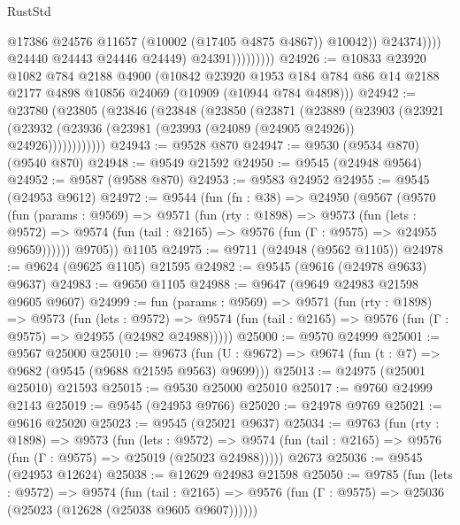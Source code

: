 \begin{lexlean}{RustStd}
\begin{coremodule}
                                    @17386
                                    @24576
                                    @11657
                                    (@10002 (@17405 @4875 @4867))
                                    @10042))
                                @24374))))
                        @24440
                        @24443
                        @24446
                        @24449)
                      @24391)))))))))
@24926 := @10833
    @23920
    @1082
    @784
    @2188
    @4900
    (@10842
      @23920
      @1953
      @184
      @784
      @86
      @14
      @2188
      @2177
      @4898
      @10856
      @24069
      (@10909 (@10944 @784 @4898)))
@24942 := @23780
    (@23805
      (@23846
        (@23848
          (@23850
            (@23871
              (@23889
                (@23903
                  (@23921
                    (@23932 (@23936 (@23981 (@23993 (@24089 (@24905 @24926)) @24926))))))))))))
@24943 := @9528 @870
@24947 := @9530 (@9534 @870) (@9540 @870)
@24948 := @9549 @21592
@24950 := @9545 (@24948 @9564)
@24952 := @9587 (@9588 @870)
@24953 := @9583 @24952
@24955 := @9545 (@24953 @9612)
@24972 := @9544
    (fun (fn : @38) =>
    @24950
      (@9567
        (@9570
          (fun (params : @9569) =>
          @9571
            (fun (rty : @1898) =>
            @9573
              (fun (lets : @9572) =>
              @9574 (fun (tail : @2165) => @9576 (fun (Γ : @9575) => @24955 @9659))))))
        @9705))
    @1105
@24975 := @9711 (@24948 (@9562 @1105))
@24978 := @9624 (@9625 @1105) @21595
@24982 := @9545 (@9616 (@24978 @9633) @9637)
@24983 := @9650 @1105
@24988 := @9647 (@9649 @24983 @21598 @9605 @9607)
@24999 := fun (params : @9569) =>
  @9571
    (fun (rty : @1898) =>
    @9573
      (fun (lets : @9572) =>
      @9574 (fun (tail : @2165) => @9576 (fun (Γ : @9575) => @24955 (@24982 @24988)))))
@25000 := @9570 @24999
@25001 := @9567 @25000
@25010 := @9673
    (fun (U : @9672) => @9674 (fun (t : @7) => @9682 (@9545 (@9688 @21595 @9563) @9699)))
@25013 := @24975 (@25001 @25010) @21593
@25015 := @9530 @25000 @25010
@25017 := @9760 @24999 @2143
@25019 := @9545 (@24953 @9766)
@25020 := @24978 @9769
@25021 := @9616 @25020
@25023 := @9545 (@25021 @9637)
@25034 := @9763
    (fun (rty : @1898) =>
    @9573
      (fun (lets : @9572) =>
      @9574 (fun (tail : @2165) => @9576 (fun (Γ : @9575) => @25019 (@25023 @24988)))))
    @2673
@25036 := @9545 (@24953 @12624)
@25038 := @12629 @24983 @21598
@25050 := @9785
    (fun (lets : @9572) =>
    @9574
      (fun (tail : @2165) =>
      @9576 (fun (Γ : @9575) => @25036 (@25023 (@12628 (@25038 @9605 @9607))))))

\end{coremodule}
\end{lexlean}
